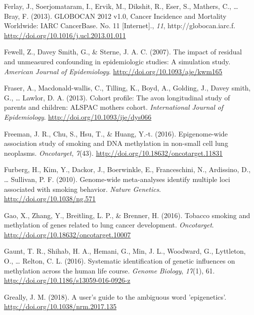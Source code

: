 \documentclass[11pt,twoside]{bristolthesis}
\newlength{\cslhangindent}
\newenvironment{cslreferences}%
  {\setlength{\parindent}{0pt}%
  \everypar{\setlength{\hangindent}{\cslhangindent}}\ignorespaces}%
  {\par}
\begin{document}
\begin{cslreferences}
\leavevmode\hypertarget{ref-Ferlay2013}{}%
Ferlay, J., Soerjomataram, I., Ervik, M., Dikshit, R., Eser, S., Mathers, C., \ldots{} Bray, F. (2013). GLOBOCAN 2012 v1.0, Cancer Incidence and Mortality Worldwide: IARC CancerBase. No. 11 {[}Internet{]}., \emph{11}, http://globocan.iarc.f. \url{http://doi.org/10.1016/j.ucl.2013.01.011}

\leavevmode\hypertarget{ref-Fewell2007}{}%
Fewell, Z., Davey Smith, G., \& Sterne, J. A. C. (2007). The impact of residual and unmeasured confounding in epidemiologic studies: A simulation study. \emph{American Journal of Epidemiology}. \url{http://doi.org/10.1093/aje/kwm165}

\leavevmode\hypertarget{ref-Fraser2013}{}%
Fraser, A., Macdonald-wallis, C., Tilling, K., Boyd, A., Golding, J., Davey smith, G., \ldots{} Lawlor, D. A. (2013). Cohort profile: The avon longitudinal study of parents and children: ALSPAC mothers cohort. \emph{International Journal of Epidemiology}. \url{http://doi.org/10.1093/ije/dys066}

\leavevmode\hypertarget{ref-Freeman2016}{}%
Freeman, J. R., Chu, S., Hsu, T., \& Huang, Y.-t. (2016). Epigenome-wide association study of smoking and DNA methylation in non-small cell lung neoplasms. \emph{Oncotarget}, \emph{7}(43). \url{http://doi.org/10.18632/oncotarget.11831}

\leavevmode\hypertarget{ref-Furberg2010}{}%
Furberg, H., Kim, Y., Dackor, J., Boerwinkle, E., Franceschini, N., Ardissino, D., \ldots{} Sullivan, P. F. (2010). Genome-wide meta-analyses identify multiple loci associated with smoking behavior. \emph{Nature Genetics}. \url{http://doi.org/10.1038/ng.571}

\leavevmode\hypertarget{ref-Gao2016}{}%
Gao, X., Zhang, Y., Breitling, L. P., \& Brenner, H. (2016). Tobacco smoking and methylation of genes related to lung cancer development. \emph{Oncotarget}. \url{http://doi.org/10.18632/oncotarget.10007}

\leavevmode\hypertarget{ref-Gaunt2016}{}%
Gaunt, T. R., Shihab, H. A., Hemani, G., Min, J. L., Woodward, G., Lyttleton, O., \ldots{} Relton, C. L. (2016). Systematic identification of genetic influences on methylation across the human life course. \emph{Genome Biology}, \emph{17}(1), 61. \url{http://doi.org/10.1186/s13059-016-0926-z}

\leavevmode\hypertarget{ref-Greally2018}{}%
Greally, J. M. (2018). A user's guide to the ambiguous word 'epigenetics'. \url{http://doi.org/10.1038/nrm.2017.135}


\end{cslreferences}
\end{document}
